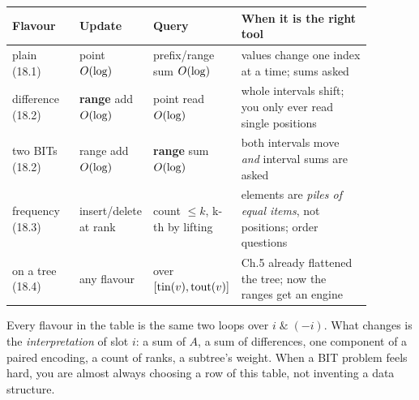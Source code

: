 \begin{center}
\small
\renewcommand{\arraystretch}{1.25}
\begin{tabular}{@{}p{0.19\linewidth} p{0.15\linewidth} p{0.15\linewidth} p{0.39\linewidth}@{}}
\toprule
\textbf{Flavour} & \textbf{Update} & \textbf{Query} & \textbf{When it is the right tool} \\
\midrule
plain (18.1) & point \(O(\log)\) & prefix/range sum \(O(\log)\) & values change one index at a time; sums asked \\
difference (18.2) & \textbf{range} add \(O(\log)\) & point read \(O(\log)\) & whole intervals shift; you only ever read single positions \\
two BITs (18.2) & range add \(O(\log)\) & \textbf{range} sum \(O(\log)\) & both intervals move \emph{and} interval sums are asked \\
frequency (18.3) & insert/delete at rank & count \(\le k\), k-th by lifting & elements are \emph{piles of equal items}, not positions; order questions \\
on a tree (18.4) & any flavour & over \([\operatorname{tin}(v),\operatorname{tout}(v)]\) & Ch.5 already flattened the tree; now the ranges get an engine \\
\bottomrule
\end{tabular}
\end{center}

\begin{insightbox}
Every flavour in the table is the same two loops over
\(i\;\&\;(-i)\).  What changes is the \emph{interpretation} of slot \(i\): a
sum of \(A\), a sum of differences, one component of a paired encoding, a
count of ranks, a subtree's weight.  When a BIT problem feels hard, you are
almost always choosing a row of this table, not inventing a data structure.
\end{insightbox}

